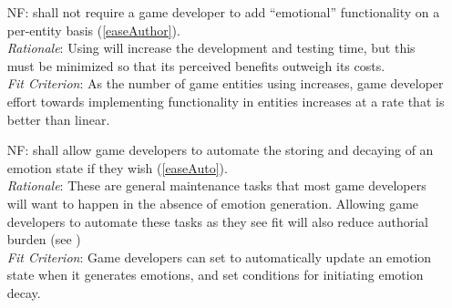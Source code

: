 \begin{itemize}[wide=0pt, leftmargin=*]
    \item[NF\refstepcounter{nfnum}\thenfnum \label{N_AuthorialEffort}:]
    \progname{} shall not require a game developer to add ``emotional''
    functionality on a per-entity basis (\ref{easeAuthor}). \vspace*{1mm}\\
    \textit{Rationale}: Using \progname{} will increase the development and
    testing time, but this must be minimized so that its perceived benefits
    outweigh its costs. \vspace*{1mm}\\
    \textit{Fit Criterion}: As the number of game entities using \progname{}
    increases, game developer effort towards implementing \progname{}
    functionality in entities increases at a rate that is better than linear.

    \item[NF\refstepcounter{nfnum}\thenfnum \label{N_Auto}:]  \progname{} shall
    allow game developers to automate the storing and decaying of an emotion
    state if they wish (\ref{easeAuto}). \vspace*{1mm}\\
    \textit{Rationale}: These are general maintenance tasks that most game
    developers will want to happen in the absence of emotion generation.
    Allowing game developers to automate these tasks as they see fit will also
    reduce authorial burden (see ) \vspace*{1mm}\\
    \textit{Fit Criterion}: Game developers can set \progname{} to
    automatically update an emotion state when it generates emotions, and set
    conditions for initiating emotion decay.

\end{itemize}

